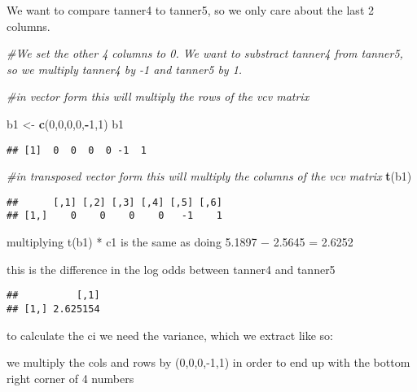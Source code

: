 \documentclass[
]{article}
\newenvironment{Shaded}{\begin{snugshade}}{\end{snugshade}}
\newcommand{\CommentTok}[1]{\textcolor[rgb]{0.56,0.35,0.01}{\textit{#1}}}
\newcommand{\DecValTok}[1]{\textcolor[rgb]{0.00,0.00,0.81}{#1}}
\newcommand{\KeywordTok}[1]{\textcolor[rgb]{0.13,0.29,0.53}{\textbf{#1}}}
\newcommand{\NormalTok}[1]{#1}
\newcommand{\OperatorTok}[1]{\textcolor[rgb]{0.81,0.36,0.00}{\textbf{#1}}}
\newcommand{\StringTok}[1]{\textcolor[rgb]{0.31,0.60,0.02}{#1}}
\begin{document}
We want to compare tanner4 to tanner5, so we only care about the last 2
columns.

\begin{Shaded}
\begin{Highlighting}[]
\CommentTok{#We set the other 4 columns to 0. We want to substract tanner4 from tanner5, so we multiply tanner4 by -1 and tanner5 by 1.}

\CommentTok{#in vector form this will multiply the rows of the vcv matrix }

\NormalTok{b1 <-}\StringTok{ }\KeywordTok{c}\NormalTok{(}\DecValTok{0}\NormalTok{,}\DecValTok{0}\NormalTok{,}\DecValTok{0}\NormalTok{,}\DecValTok{0}\NormalTok{,}\OperatorTok{-}\DecValTok{1}\NormalTok{,}\DecValTok{1}\NormalTok{)}
\NormalTok{b1}
\end{Highlighting}
\end{Shaded}

\begin{verbatim}
## [1]  0  0  0  0 -1  1
\end{verbatim}

\begin{Shaded}
\begin{Highlighting}[]
\CommentTok{#in transposed vector form this will multiply the columns of the vcv matrix }
\KeywordTok{t}\NormalTok{(b1) }
\end{Highlighting}
\end{Shaded}

\begin{verbatim}
##      [,1] [,2] [,3] [,4] [,5] [,6]
## [1,]    0    0    0    0   -1    1
\end{verbatim}

multiplying t(b1) * c1 is the same as doing 5.1897 − 2.5645 = 2.6252

this is the difference in the log odds between tanner4 and tanner5

\begin{Shaded}
\end{Shaded}

\begin{verbatim}
##          [,1]
## [1,] 2.625154
\end{verbatim}

to calculate the ci we need the variance, which we extract like so:

we multiply the cols and rows by (0,0,0,-1,1) in order to end up with
the bottom right corner of 4 numbers
\end{document}

